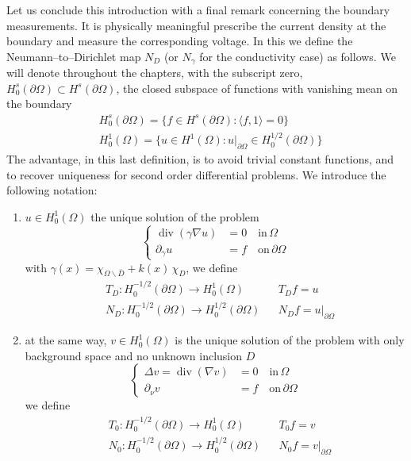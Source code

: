 \documentclass[10pt, a4paper, twoside, openright]{book}
\theoremstyle{definition}
\theoremstyle{plain}
\theoremstyle{plain}
\theoremstyle{plain}
\theoremstyle{plain}
\theoremstyle{plain}
\theoremstyle{plain}
\theoremstyle{plain}
\theoremstyle{plain}
\DeclareMathOperator{\divergence}{div}
\begin{document}
Let us conclude this introduction with a final remark concerning the boundary measurements.
It is physically meaningful prescribe the current density at the boundary and measure the corresponding voltage.
In this we define the Neumann--to--Dirichlet map $N_D$ (or $N_\gamma$ for the conductivity case) as follows.
We will denote throughout the chapters, with the subscript zero, $H^s_0(\partial\Omega)\subset H^s(\partial\Omega)$, the closed subspace of functions with vanishing mean on the boundary
\begin{align}
&H^s_0(\partial\Omega) = \Big\{ f \in H^s(\partial\Omega): \langle f,1\rangle = 0\Big\}\\
&H^1_0(\Omega) = \Big\{ u \in H^1(\Omega): u|_{\partial\Omega} \in H^{1/2}_0(\partial\Omega)\Big\}
\end{align}
The advantage, in this last definition, is to avoid trivial constant functions, and to recover uniqueness for second order differential problems.
We introduce the following notation:
\begin{enumerate}
 \item $u\in H^1_0(\Omega)$ the unique solution of the problem
 \begin{equation}
 \label{eq:NtoD-inclusion}
  \left\{
  \begin{aligned}
  \divergence(\gamma\nabla u) &= 0 \quad\text{in}\,\Omega \\
            \partial_\gamma u &= f \quad\text{on}\,\partial \Omega
  \end{aligned}
  \right.
 \end{equation}
 with $\gamma(x) = \chi_{\Omega\backslash\overline{D}} + k(x)\,\chi_D$, we define
 \begin{align}
 &T_D: H^{-1/2}_0(\partial \Omega) \to H^1_0(\Omega) && T_Df = u \\
 &{N_D}: H^{-1/2}_0(\partial \Omega) \to H^{1/2}_0(\partial\Omega) && {N_D}f = u|_{\partial\Omega}
 \end{align}
 \item at the same way, $v\in H^1_0(\Omega)$ is the unique solution of the problem with only background space and no unknown inclusion $D$
 \begin{equation}
 \label{eq:NtoD-laplace}
  \left\{
  \begin{aligned}
  \Delta v = \divergence(\nabla v) &= 0 \quad\text{in}\,\Omega \\
            \partial_\nu v &= f \quad\text{on}\,\partial \Omega
  \end{aligned}
  \right.
 \end{equation}
 we define
 \begin{align}
 &T_0: H^{-1/2}_0(\partial \Omega) \to H^1_0(\Omega) && T_0f = v \\
 &{N_0}: H^{-1/2}_0(\partial \Omega) \to H^{1/2}_0(\partial\Omega) && {N_0} f = v|_{\partial\Omega}
 \end{align}
\end{enumerate}
\end{document}
